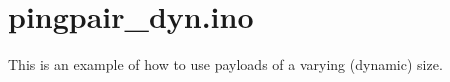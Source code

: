 \hypertarget{pingpair_dyn_8ino-example}{\section{pingpair\+\_\+dyn.\+ino}
}
This is an example of how to use payloads of a varying (dynamic) size.


\begin{DoxyCodeInclude}
\end{DoxyCodeInclude}
 